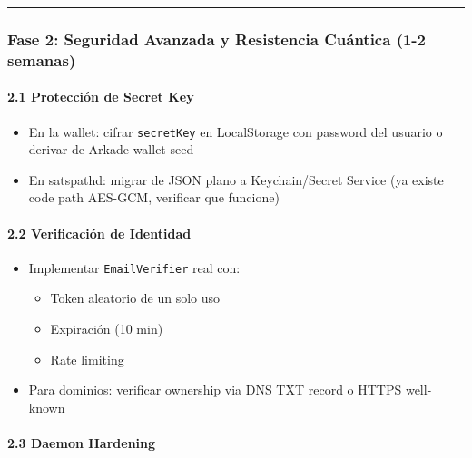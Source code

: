 \documentclass[
]{article}
\providecommand{\tightlist}{%
  \setlength{\itemsep}{0pt}\setlength{\parskip}{0pt}}
\begin{document}
\begin{center}\rule{0.5\linewidth}{0.5pt}\end{center}

\hypertarget{fase-2-seguridad-avanzada-y-resistencia-cuuxe1ntica-1-2-semanas}{%
\subsubsection{Fase 2: Seguridad Avanzada y Resistencia Cuántica (1-2
semanas)}\label{fase-2-seguridad-avanzada-y-resistencia-cuuxe1ntica-1-2-semanas}}

\hypertarget{protecciuxf3n-de-secret-key}{%
\paragraph{2.1 Protección de Secret
Key}\label{protecciuxf3n-de-secret-key}}

\begin{itemize}
\tightlist
\item[$\square$]
  En la wallet: cifrar \texttt{secretKey} en LocalStorage con password
  del usuario o derivar de Arkade wallet seed
\item[$\square$]
  En satspathd: migrar de JSON plano a Keychain/Secret Service (ya
  existe code path AES-GCM, verificar que funcione)
\end{itemize}

\hypertarget{verificaciuxf3n-de-identidad}{%
\paragraph{2.2 Verificación de
Identidad}\label{verificaciuxf3n-de-identidad}}

\begin{itemize}
\tightlist
\item[$\square$]
  Implementar \texttt{EmailVerifier} real con:

  \begin{itemize}
  \tightlist
  \item[$\square$]
    Token aleatorio de un solo uso
  \item[$\square$]
    Expiración (10 min)
  \item[$\square$]
    Rate limiting
  \end{itemize}
\item[$\square$]
  Para dominios: verificar ownership via DNS TXT record o HTTPS
  well-known
\end{itemize}

\hypertarget{daemon-hardening}{%
\paragraph{2.3 Daemon Hardening}\label{daemon-hardening}}
\end{document}

